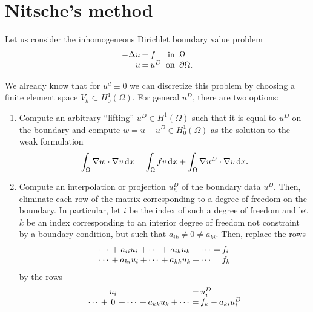 \section{Nitsche's method}

\begin{intro}
Let us consider the inhomogeneous Dirichlet boundary value problem
\begin{gather}
  \label{eq:nitsche:1}
    \arraycolsep1pt
  \begin{array}{rclrl}
    -\Delta u &=& f
    &\text{ in }&\Omega\\
    u &=& u^D &\text{ on }&\partial\Omega.
  \end{array}
\end{gather}

We already know that for $u^d\equiv 0$ we can discretize this problem
by choosing a finite element space $V_h \subset H^1_0(\Omega)$. For
general $u^D$, there are two options:
\begin{enumerate}
\item Compute an arbitrary ``lifting'' $u^D\in H^1(\Omega)$ such that
  it is equal to $u^D$ on the boundary and compute
  $w=u-u^D \in H^1_0(\Omega)$ as the solution to the weak formulation
  \begin{gather}
    \label{eq:nitsche:1a}
    \int_\Omega \nabla w\cdot\nabla v\,\mathrm{d} x
    = \int_\Omega f v\,\mathrm{d} x
    + \int_\Omega \nabla u^D\cdot\nabla v\,\mathrm{d} x.
  \end{gather}
\item Compute an interpolation or projection $u^D_h$ of the boundary
  data $u^D$. Then, eliminate each row of the matrix corresponding to
  a degree of freedom on the boundary. In particular, let $i$ be the
  index of such a degree of freedom and let $k$ be an index
  corresponding to an interior degree of freedom not constraint by a
  boundary condition, but such that $a_{ik}\neq 0 \neq a_{ki}$. Then,
  replace the rows
  \begin{gather}
    \arraycolsep1pt
    \begin{array}{ccccccccccl}
      \cdots &+& a_{ii} u_i &+& \cdots &+& a_{ik} u_k &+& \cdots &=& f_i \\
      \cdots &+& a_{ki} u_i &+& \cdots &+& a_{kk} u_k &+& \cdots &=& f_k
    \end{array}
  \end{gather}
  by the rows
  \begin{gather}
    \arraycolsep1pt
    \begin{array}{ccccccccccl}
      && u_i &&  && &&  &=& u^D_i \\
      \cdots &+& 0 &+& \cdots &+& a_{kk} u_k &+& \cdots &=& f_k - a_{ki} u^D_i
    \end{array}
  \end{gather}
\end{enumerate}


\end{intro}

